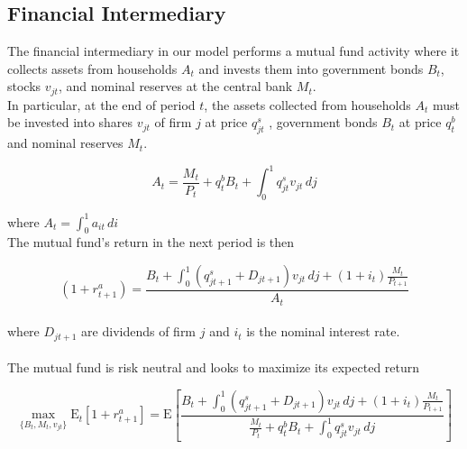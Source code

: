 \documentclass[titlepage]{\econtex}\providecommand{\texname}{BufferStockTheory}
\begin{document}
\begin{comment}
Combining the transition equations, the recursive nature of
the problem allows us to rewrite it more compactly in Bellman equation form,
\begin{eqnarray*}
\VFunc_{t}(\mLevBF_{t},\pLevBF_{t}) & = & \max_{\cLevBF_{t}}~\left\{\util(\cLevBF_{t})+\DiscFac \Ex_{t}\left[ \VFunc_{t+1}((\mLevBF_{t}-\cLevBF_{t})\Rfree+ \pLevBF_{t+1}\tShkAll_{t+1},\pLevBF_{t} \PGro  \pShk_{t+1})\right]\right\}
.
\end{eqnarray*}
\end{comment}

\hypertarget{Financial Intermediary}{}
\subsection{Financial Intermediary}

\label{subsec:Financial Intermediary}

The financial intermediary in our model performs a mutual fund activity where it  collects assets from households $A_{t}$ and invests them into government bonds $B_{t}$, stocks $v_{jt}$, and nominal reserves at the central bank $M_{t}$.\\ 

In particular, at the end of period $t$, the assets collected from households $A_{t}$ must be invested into shares $\mathit{v}_{jt}$ of firm $j$ at price  $q^{s}_{jt}$ , government bonds $B_{t}$ at price $q^{b}_{t}$ and nominal reserves $M_{t}$. 

$$A_{t} = \frac{M_{t}}{P_{t}} +q^{b}_{t} B_{t} + \int_{0}^{1} q^{s}_{jt}\mathit{v}_{jt}\,dj$$

where $A_{t} = \int_{0}^{1} a_{it} \, di$ \\

The mutual fund's return in the next period is then 

$$(1+r^{a}_{t+1})  = \frac{  B_{t} + \int_{0}^{1} (q^{s}_{jt+1}+ D_{jt+1})\mathit{v}_{jt} \, dj +(1+i_{t}) \frac{M_{t}}{P_{t+1}}}{A_{t}}$$\\ 

where  $D_{jt+1}$ are dividends of firm $j$ and $i_{t}$ is the nominal interest rate. \\ \\

The mutual fund is risk neutral and looks to maximize its expected return 


$$\max_{\{B_{t}, M_{t} , \mathit{v}_{jt} \}} \mathrm{E}_{t}\left[1+r^{a}_{t+1} \right] = \mathrm{E}\left[ \frac{ B_{t} + \int_{0}^{1} (q^{s}_{jt+1}+ D_{jt+1})\mathit{v}_{jt} \, dj +(1+i_{t}) \frac{M_{t}}{P_{t+1}}}{\frac{M_{t}}{P_{t}} +q^{b}_{t} B_{t} + \int_{0}^{1} q^{s}_{jt}\mathit{v}_{jt}\,dj} \right]$$ \\
\end{document}

